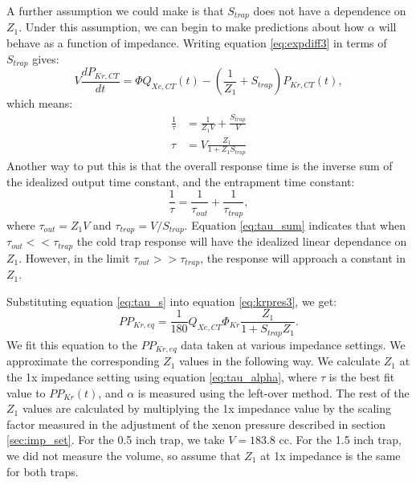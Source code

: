 \documentclass[12pt]{article}
\begin{document}
A further assumption we could make is that $S_{trap}$ does not have a dependence on $Z_1$. Under this assumption, we can begin to make predictions about how $\alpha$ will behave as a function of impedance. Writing equation \ref{eq:expdiff3} in terms of $S_{trap}$ gives:
\begin{equation}
V\frac{dP_{Kr,CT}}{dt}=\Phi Q_{Xe,CT}(t)-(\frac{1}{Z_1}+S_{trap})P_{Kr,CT}(t),
\end{equation}
which means:
\begin{align}
\label{eq:tau_s}
\frac{1}{\tau}&=\frac{1}{Z_1 V}+\frac{S_{trap}}{V}\\
\tau&=V\frac{Z_1}{1+Z_1S_{trap}}
\end{align}
Another way to put this is that the overall response time is the inverse sum of the idealized output time constant, and the entrapment time constant:
\begin{equation}
\label{eq:tau_sum}
\frac{1}{\tau}=\frac{1}{\tau_{out}}+\frac{1}{\tau_{trap}},
\end{equation}
where $\tau_{out}=Z_1V$ and $\tau_{trap}=V/S_{trap}$. Equation \ref{eq:tau_sum} indicates that when $\tau_{out}<<\tau_{trap}$ the cold trap response will have the idealized linear dependance on $Z_1$. However, in the limit $\tau_{out}>>\tau_{trap}$, the response will approach a constant in $Z_1$.

Substituting equation \ref{eq:tau_s} into equation \ref{eq:krpres3}, we get:
\begin{equation}
\label{eq:krpres4}
PP_{Kr,eq}=\frac{1}{180}Q_{Xe,CT}\Phi_{Kr}\frac{Z_1}{1+S_{trap}Z_1}.
\end{equation}
We fit this equation to the $PP_{Kr,eq}$ data taken at various impedance settings. We approximate the corresponding $Z_1$ values in the following way. We calculate $Z_1$ at the 1x impedance setting using equation \ref{eq:tau_alpha}, where $\tau$ is the best fit value to $PP_{Kr}(t)$, and $\alpha$ is measured using the left-over method. The rest of the $Z_1$ values are calculated by multiplying the 1x impedance value by the scaling factor measured in the adjustment of the xenon pressure described in section \ref{sec:imp_set}. For the 0.5 inch trap, we take $V=183.8$ cc. For the 1.5 inch trap, we did not measure the volume, so assume that $Z_1$ at 1x impedance is the same for both traps.
\end{document}
